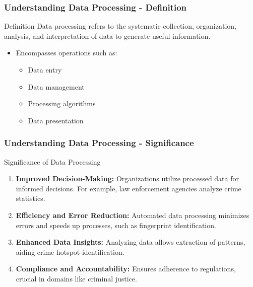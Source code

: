 \documentclass[aspectratio=169]{beamer}
\begin{document}
\begin{frame}[fragile]
    \frametitle{Understanding Data Processing - Definition}
    \begin{block}{Definition}
        Data processing refers to the systematic collection, organization, analysis, and interpretation of data to generate useful information.
    \end{block}
    \begin{itemize}
        \item Encompasses operations such as:
        \begin{itemize}
            \item Data entry
            \item Data management
            \item Processing algorithms
            \item Data presentation
        \end{itemize}
    \end{itemize}
\end{frame}

\begin{frame}[fragile]
    \frametitle{Understanding Data Processing - Significance}
    \begin{block}{Significance of Data Processing}
        \begin{enumerate}
            \item \textbf{Improved Decision-Making:}
                Organizations utilize processed data for informed decisions. For example, law enforcement agencies analyze crime statistics.
                
            \item \textbf{Efficiency and Error Reduction:}
                Automated data processing minimizes errors and speeds up processes, such as fingerprint identification.
                
            \item \textbf{Enhanced Data Insights:}
                Analyzing data allows extraction of patterns, aiding crime hotspot identification.
                
            \item \textbf{Compliance and Accountability:}
                Ensures adherence to regulations, crucial in domains like criminal justice.
        \end{enumerate}
    \end{block}
\end{frame}
\end{document}

